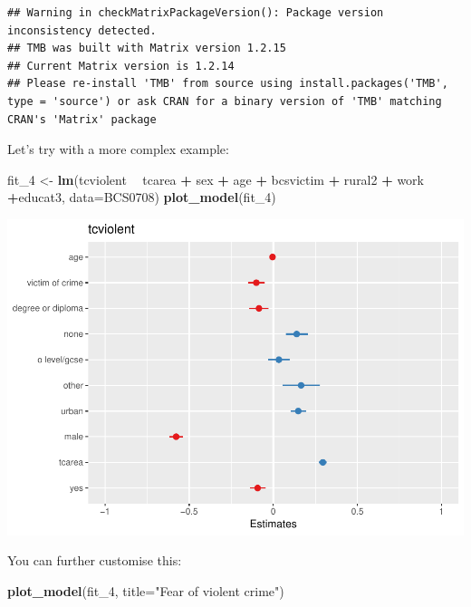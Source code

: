 \documentclass[]{book}
\newenvironment{Shaded}{\begin{snugshade}}{\end{snugshade}}
\newcommand{\DataTypeTok}[1]{\textcolor[rgb]{0.13,0.29,0.53}{#1}}
\newcommand{\DecValTok}[1]{\textcolor[rgb]{0.00,0.00,0.81}{#1}}
\newcommand{\KeywordTok}[1]{\textcolor[rgb]{0.13,0.29,0.53}{\textbf{#1}}}
\newcommand{\NormalTok}[1]{#1}
\newcommand{\OperatorTok}[1]{\textcolor[rgb]{0.81,0.36,0.00}{\textbf{#1}}}
\newcommand{\StringTok}[1]{\textcolor[rgb]{0.31,0.60,0.02}{#1}}
\theoremstyle{definition}
\theoremstyle{definition}
\theoremstyle{definition}
\theoremstyle{remark}
\begin{document}
\begin{verbatim}
## Warning in checkMatrixPackageVersion(): Package version inconsistency detected.
## TMB was built with Matrix version 1.2.15
## Current Matrix version is 1.2.14
## Please re-install 'TMB' from source using install.packages('TMB', type = 'source') or ask CRAN for a binary version of 'TMB' matching CRAN's 'Matrix' package
\end{verbatim}

Let's try with a more complex example:

\begin{Shaded}
\begin{Highlighting}[]
\NormalTok{fit_}\DecValTok{4}\NormalTok{ <-}\StringTok{ }\KeywordTok{lm}\NormalTok{(tcviolent }\OperatorTok{~}\StringTok{ }\NormalTok{tcarea }\OperatorTok{+}\StringTok{ }\NormalTok{sex }\OperatorTok{+}\StringTok{ }\NormalTok{age }\OperatorTok{+}\StringTok{ }\NormalTok{bcsvictim }\OperatorTok{+}\StringTok{ }\NormalTok{rural2 }\OperatorTok{+}\StringTok{ }\NormalTok{work }\OperatorTok{+}\NormalTok{educat3, }\DataTypeTok{data=}\NormalTok{BCS0708)}
\KeywordTok{plot_model}\NormalTok{(fit_}\DecValTok{4}\NormalTok{)}
\end{Highlighting}
\end{Shaded}

\includegraphics{08-regression_files/figure-latex/unnamed-chunk-25-1.pdf}

You can further customise this:

\begin{Shaded}
\begin{Highlighting}[]
\KeywordTok{plot_model}\NormalTok{(fit_}\DecValTok{4}\NormalTok{, }\DataTypeTok{title=}\StringTok{"Fear of violent crime"}\NormalTok{)}
\end{Highlighting}
\end{Shaded}
\end{document}
